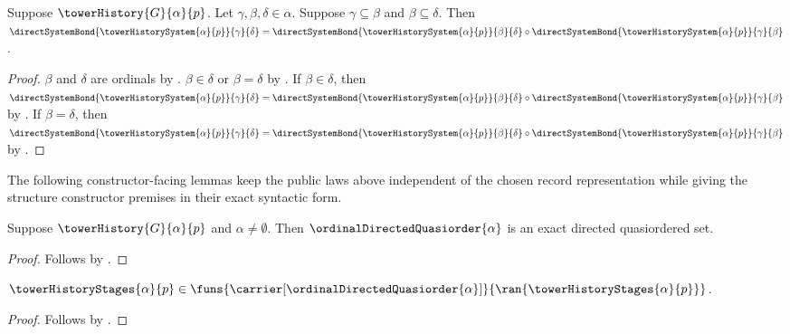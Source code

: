 \begin{proposition}\label{tower_history_system_bond_composition}
    Suppose $\towerHistory{G}{\alpha}{p}$.
    Let $\gamma,\beta,\delta\in\alpha$.
    Suppose $\gamma\subseteq\beta$ and $\beta\subseteq\delta$.
    Then $\directSystemBond{\towerHistorySystem{\alpha}{p}}
            {\gamma}{\delta}
        =\directSystemBond{\towerHistorySystem{\alpha}{p}}
            {\beta}{\delta}\circ
         \directSystemBond{\towerHistorySystem{\alpha}{p}}
            {\gamma}{\beta}$.
\end{proposition}
\begin{proof}
    $\beta$ and $\delta$ are ordinals by
        .
    $\beta\in\delta$ or $\beta=\delta$ by
        .
    If $\beta\in\delta$, then
        $\directSystemBond{\towerHistorySystem{\alpha}{p}}
                {\gamma}{\delta}
            =\directSystemBond{\towerHistorySystem{\alpha}{p}}
                {\beta}{\delta}\circ
             \directSystemBond{\towerHistorySystem{\alpha}{p}}
                {\gamma}{\beta}$ by
        .
    If $\beta=\delta$, then
        $\directSystemBond{\towerHistorySystem{\alpha}{p}}
                {\gamma}{\delta}
            =\directSystemBond{\towerHistorySystem{\alpha}{p}}
                {\beta}{\delta}\circ
             \directSystemBond{\towerHistorySystem{\alpha}{p}}
                {\gamma}{\beta}$ by
        .
\end{proof}

The following constructor-facing lemmas keep the public laws above independent
of the chosen record representation while giving the structure constructor
premises in their exact syntactic form.

\begin{proposition}\label{tower_history_index_is_directed}
    Suppose $\towerHistory{G}{\alpha}{p}$ and
        $\alpha\neq\emptyset$.
    Then $\ordinalDirectedQuasiorder{\alpha}$ is an exact
        directed quasiordered set.
\end{proposition}
\begin{proof}
    Follows by
        .
\end{proof}

\begin{proposition}\label{tower_history_stage_family_type}
    $\towerHistoryStages{\alpha}{p}\in
        \funs{\carrier[\ordinalDirectedQuasiorder{\alpha}]}{
            \ran{\towerHistoryStages{\alpha}{p}}}$.
\end{proposition}
\begin{proof}
    Follows by
        .
\end{proof}

